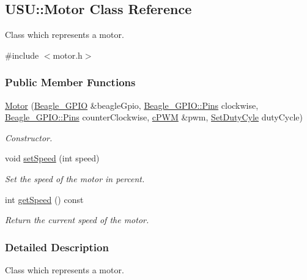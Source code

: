 \hypertarget{class_u_s_u_1_1_motor}{\subsection{\-U\-S\-U\-:\-:\-Motor \-Class \-Reference}
\label{class_u_s_u_1_1_motor}
}


\-Class which represents a motor.  




{\ttfamily \#include $<$motor.\-h$>$}

\subsubsection*{\-Public \-Member \-Functions}
\begin{DoxyCompactItemize}
\item 
\hyperlink{class_u_s_u_1_1_motor_a2200a3939cd62d2e22e9b134b54bc402}{\-Motor} (\hyperlink{class_beagle___g_p_i_o}{\-Beagle\-\_\-\-G\-P\-I\-O} \&beagle\-Gpio, \hyperlink{class_beagle___g_p_i_o_a9b1fd560ea5d2d65898ac15c23055e58}{\-Beagle\-\_\-\-G\-P\-I\-O\-::\-Pins} clockwise, \hyperlink{class_beagle___g_p_i_o_a9b1fd560ea5d2d65898ac15c23055e58}{\-Beagle\-\_\-\-G\-P\-I\-O\-::\-Pins} counter\-Clockwise, \hyperlink{classc_p_w_m}{c\-P\-W\-M} \&pwm, \hyperlink{motor_8h_aa4a2cd53d0866ae4c273573db3c4870d}{\-Set\-Duty\-Cyle} duty\-Cycle)
\begin{DoxyCompactList}\small\item\em \-Constructor. \end{DoxyCompactList}\item 
void \hyperlink{class_u_s_u_1_1_motor_aa58cbc26a0da87389dd208367d0fa407}{set\-Speed} (int speed)
\begin{DoxyCompactList}\small\item\em \-Set the speed of the motor in percent. \end{DoxyCompactList}\item 
int \hyperlink{class_u_s_u_1_1_motor_a98d4c98ddc30e00485712f55b4a91211}{get\-Speed} () const 
\begin{DoxyCompactList}\small\item\em \-Return the current speed of the motor. \end{DoxyCompactList}\end{DoxyCompactItemize}


\subsubsection{\-Detailed \-Description}
\-Class which represents a motor. 

